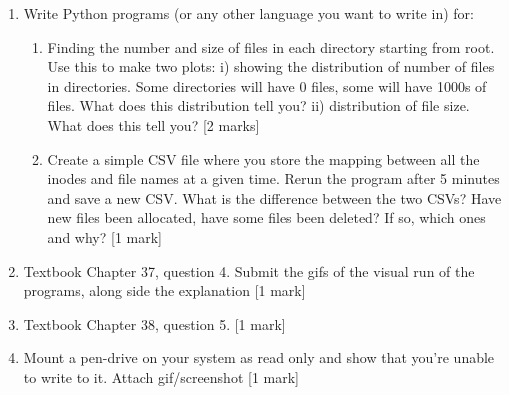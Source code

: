 \documentclass[]{article}
\begin{document}
\begin{enumerate}
	\item Write Python programs (or any other language you want to write in) for:
	
	\begin{enumerate}
		\item Finding the number and size of files in each directory starting from root. Use this to make two plots: i) showing the distribution of number of files in directories. Some directories will have 0 files, some will have 1000s of files. What does this distribution tell you? ii) distribution of file size. What does this tell you? [2 marks]
		\item Create a simple CSV file where you store the mapping between all the inodes and file names at a given time. Rerun the program after 5 minutes and save a new CSV. What is the difference between the two CSVs? Have new files been allocated, have some files been deleted? If so, which ones and why? [1 mark]
	\end{enumerate}


\item Textbook Chapter 37, question 4. Submit the gifs of the visual run of the programs, along side the explanation [1 mark]
\item Textbook Chapter 38, question 5. [1 mark]
\item Mount a pen-drive on your system as read only and show that you're unable to write to it. Attach gif/screenshot [1 mark]

	
	

	 
\end{enumerate}
\end{document}
